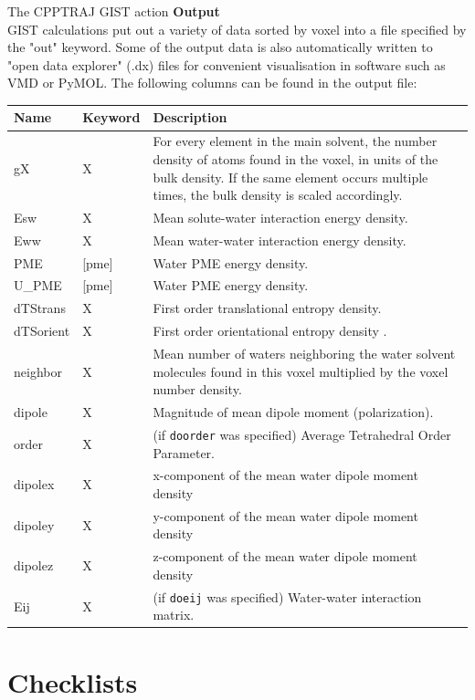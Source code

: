 \documentclass[9pt,tutorial]{livecoms}
\newcommand\inlinecode{\texttt}
\begin{document}
\begin{Checklists*}
\begin{checklist}{The CPPTRAJ GIST action}
\textbf{Output}\\
GIST calculations put out a variety of data sorted by voxel into a file 
specified by the "out" keyword. Some of the output data is also automatically 
written to "open data explorer" (.dx) files for convenient visualisation in 
software such as VMD or PyMOL. The following columns can be found in the output 
file:
\begin{tabular}{@{}l l p{}@{}}
\toprule
Name & Keyword & Description\\
\midrule
gX & X & For every element in the main solvent, the number density of atoms found in the voxel, in units of the bulk density. If the same element occurs multiple times, the bulk density is scaled accordingly. \\
Esw & X &  Mean solute-water interaction energy density. \\
Eww & X & Mean water-water interaction energy density. \\
PME & [pme] & Water PME energy density. \\
U\_PME & [pme] & Water PME energy density. \\
dTStrans & X & First order translational entropy density. \\
dTSorient & X & First order orientational entropy density . \\
neighbor & X & Mean number of waters neighboring the water solvent molecules found in this voxel multiplied by the voxel number density. \\
dipole & X & Magnitude of mean dipole moment (polarization). \\
order & X & (if \inlinecode{doorder} was specified) Average Tetrahedral Order Parameter. \\
dipolex & X & x-component of the mean water dipole moment density \\
dipoley & X & y-component of the mean water dipole moment density \\
dipolez & X & z-component of the mean water dipole moment density \\
Eij & X & (if \inlinecode{doeij} was specified) Water-water interaction matrix. \\
\bottomrule
\end{tabular}
\end{checklist}
\end{Checklists*}

\section{Checklists}
\end{document}

